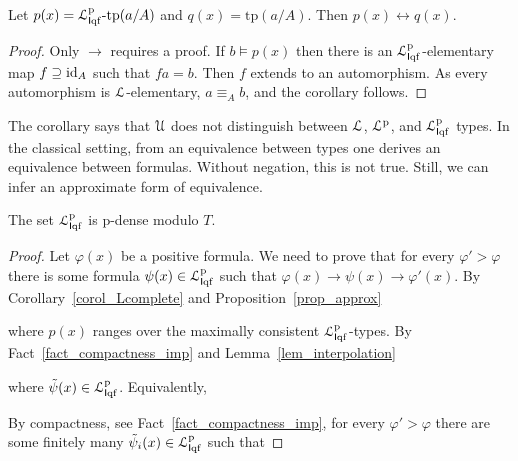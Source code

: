 \documentclass[10pt,oneside]{amsproc}
\begin{document}
{\begin{corollary}\label{corol_Lcomplete}
  Let $p(x)={\EuScript L}^{\rm p}_{{\sf I}{\rm qf}}\mbox{-tp}(a/A)$ and $q(x)=\mbox{tp}(a/A)$. Then $p(x)\leftrightarrow q(x)$.
\end{corollary}

\begin{proof}
  Only $\rightarrow$ requires a proof.
  If $b\models p(x)$ then there is an ${\EuScript L}^{\rm p}_{{\sf I}{\rm qf}}$-elementary map $f\supseteq{\rm id}_A$ such that $fa=b$.
  Then $f$ extends to an automorphism.
  As every automorphism is ${\EuScript L}$-elementary, $a\equiv_Ab$, and the corollary follows.
\end{proof}

The corollary says that ${\EuScript U}$ does not distinguish between ${\EuScript L}$, ${\EuScript L}^{\rm p}$, and ${\EuScript L}^{\rm p}_{{\sf I}{\rm qf}}$ types.
In the classical setting, from an equivalence between types one derives an equivalence between formulas.
Without negation, this is not true.
Still, we can infer an approximate form of equivalence.

\begin{proposition}\label{prop_LHapprox1}
  The set ${\EuScript L}^{\rm p}_{{\sf I}{\rm qf}}$ is p-dense modulo $T$.
\end{proposition}

\begin{proof}
  Let $\varphi(x)$ be a positive formula.
  We need to prove that for every $\varphi'>\varphi$ there is some formula $\psi(x)\in{\EuScript L}^{\rm p}_{{\sf I}{\rm qf}}$ such that $\varphi(x)\rightarrow\psi(x)\rightarrow\varphi'(x)$.
  By Corollary~\ref{corol_Lcomplete} and Proposition~\ref{prop_approx}


  where $p(x)$ ranges over the maximally consistent ${\EuScript L}^{\rm p}_{{\sf I}{\rm qf}}$-types.
  By Fact~\ref{fact_compactness_imp} and Lemma~\ref{lem_interpolation}


  where $\tilde{\psi}(x)\in{\EuScript L}^{\rm p}_{{\sf I}{\rm qf}}$.
  Equivalently,


  By compactness, see Fact~\ref{fact_compactness_imp}, for every $\varphi'>\varphi$ there are some finitely many $\tilde{\psi}_i(x)\in{\EuScript L}^{\rm p}_{{\sf I}{\rm qf}}$ such that


\end{proof}}
\end{document}
